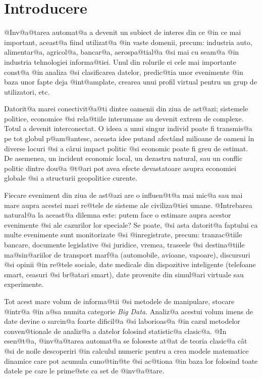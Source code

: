 

\chapter*{Introducere}
\label{capintro}

@Inv@a@tarea automat@a a devenit un subiect de interes din ce @in ce mai important, aceast@a fiind utilizat@a @in vaste domenii, precum: industria auto, alimentar@a, agricol@a, bancar@a, aerospa@tial@a @si mai cu seam@a @in industria tehnologiei informa@tiei. Unul din rolurile ei cele mai importante const@a @in analiza @si clasificarea datelor, predic@tia unor evenimente @in baza unor fapte deja @int@amplate, crearea unui profil virtual pentru un grup de utilizatori, etc.


Datorit@a marei conectivit@a@ti dintre oamenii din ziua de ast@azi; sistemele politice, economice @si rela@tiile interumane au devenit extrem de complexe. Totul a devenit interconectat. O ideea a unui singur individ poate fi transmis@a pe tot globul p@am@antesc, aceasta idee putand afect\^ and milioane de oameni \^ in diverse locuri @si a c\^ arui impact politic @si economic poate fi greu de estimat. De asemenea, un incident economic local, un dezastru natural, sau un conflic politic dintre dou@a @t@ari pot avea efecte devastatoare asupra economiei globale @si a structurii geopolitice curente.

Fiecare eveniment din ziua de ast@azi are o influen@t@a mai mic@a sau mai mare aupra acestei mari re@tele de sisteme ale civiliza@tiei umane. @Intrebarea natural@a la aceast@a dilemna este: putem face o estimare aupra acestor evenimente @si ale cazurilor lor speciale? Se poate, @si asta datorit@a faptului ca multe evenimente sunt monitorizate @si @inregistrate, precum: tranzac@tiile bancare, documente legislative @si juridice, vremea, traseele @si destina@tiile ma@sin@ariilor de transport marf@a (automobile, avioane, vapoare), discursuri @si opinii @in re@tele sociale, date medicale din dispozitive inteligente (telefoane smart, ceasuri @si br@atari smart), date provenite din simul@ari virtuale sau experimente. 

Tot acest mare volum de informa@tii @si metodele de manipulare, stocare @intr@a @in a@sa numita categorie {\sl Big Data}. Analiz@a acestui volum imens de date devine o sarcin@a foarte dificil@a @si laborioas@a @in cazul metodelor conven@tionale de analiz@a a datelor folosind statistic@a clasic@a. @In esen@t@a, @inv@a@tarea automat@a se foloseste at@at de teoria clasic@a c\^  at @si de noile descoperiri @in calculul numeric pentru a crea modele matematice dinamice care pot acumula cuno@tin@te @si ac@tiona @in baza lor folosind toate datele pe care le prime@ste ca set de @inv@a@tare.

